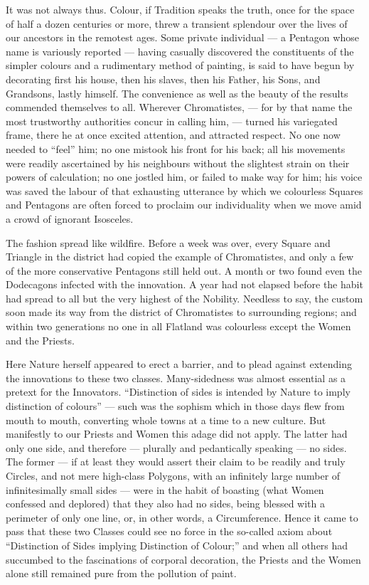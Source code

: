 \documentclass[12pt, a4paper, oneside]{memoir}
\begin{document}
It was not always thus. Colour, if Tradition speaks the truth, once for the
space of half a dozen centuries or more, threw a transient splendour over the
lives of our ancestors in the remotest ages. Some private individual --- a
Pentagon whose name is variously reported --- having casually discovered the
constituents of the simpler colours and a rudimentary method of painting, is
said to have begun by decorating first his house, then his slaves, then his
Father, his Sons, and Grandsons, lastly himself. The convenience as well as
the beauty of the results commended themselves to all. Wherever Chromatistes,
--- for by that name the most trustworthy authorities concur in calling him, ---
turned his variegated frame, there he at once excited attention, and attracted
respect. No one now needed to ``feel'' him; no one mistook his front for his
back; all his movements were readily ascertained by his neighbours without the
slightest strain on their powers of calculation; no one jostled him, or failed
to make way for him; his voice was saved the labour of that exhausting
utterance by which we colourless Squares and Pentagons are often forced to
proclaim our individuality when we move amid a crowd of ignorant Isosceles.

The fashion spread like wildfire. Before a week was over, every Square and
Triangle in the district had copied the example of Chromatistes, and only a
few of the more conservative Pentagons still held out. A month or two found
even the Dodecagons infected with the innovation. A year had not elapsed
before the habit had spread to all but the very highest of the Nobility.
Needless to say, the custom soon made its way from the district of
Chromatistes to surrounding regions; and within two generations no one in all
Flatland was colourless except the Women and the Priests.

Here Nature herself appeared to erect a barrier, and to plead against
extending the innovations to these two classes. Many-sidedness was almost
essential as a pretext for the Innovators. ``Distinction of sides is intended
by Nature to imply distinction of colours'' --- such was the sophism which in
those days flew from mouth to mouth, converting whole towns at a time to a new
culture. But manifestly to our Priests and Women this adage did not apply. The
latter had only one side, and therefore --- plurally and pedantically speaking ---
no sides. The former --- if at least they would assert their claim to be readily
and truly Circles, and not mere high-class Polygons, with an infinitely large
number of infinitesimally small sides --- were in the habit of boasting (what
Women confessed and deplored) that they also had no sides, being blessed with
a perimeter of only one line, or, in other words, a Circumference. Hence it
came to pass that these two Classes could see no force in the so-called axiom
about ``Distinction of Sides implying Distinction of Colour;'' and when all
others had succumbed to the fascinations of corporal decoration, the Priests
and the Women alone still remained pure from the pollution of paint.
\end{document}
